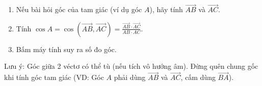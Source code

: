 \begin{enumerate}
\item Nếu bài hỏi góc của tam giác (ví dụ góc $A$), hãy tính $\overrightarrow{AB}$ và $\overrightarrow{AC}$.
\item Tính $\cos A = \cos(\overrightarrow{AB}, \overrightarrow{AC}) = \frac{\overrightarrow{AB} \cdot \overrightarrow{AC}}{AB \cdot AC}$.
\item Bấm máy tính suy ra số đo góc.
\end{enumerate}
Lưu ý: Góc giữa 2 véctơ có thể tù (nếu tích vô hướng âm). Đừng quên chung gốc khi tính góc tam giác (VD: Góc $A$ phải dùng $\overrightarrow{AB}$ và $\overrightarrow{AC}$, cấm dùng $\overrightarrow{BA}$).
